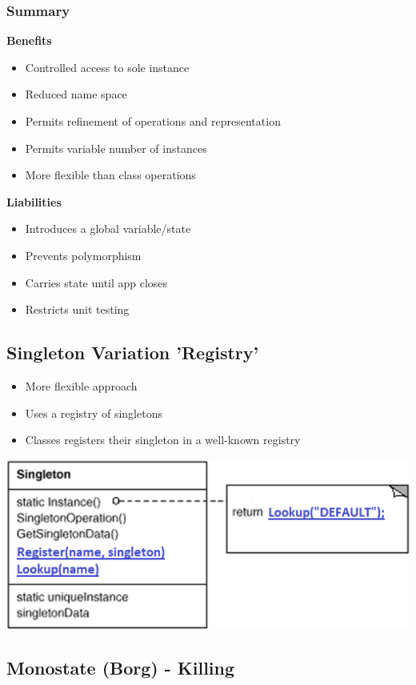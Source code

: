 \subsubsection{Summary}
\textbf{Benefits}
\begin{itemize}
    \item Controlled access to sole instance
    \item Reduced name space
    \item Permits refinement of operations and representation
    \item Permits variable number of instances
    \item More flexible than class operations
\end{itemize}
\textbf{Liabilities}
\begin{itemize}
    \item Introduces a global variable/state
    \item Prevents polymorphism
    \item Carries state until app closes
    \item Restricts unit testing
\end{itemize}

\subsection{Singleton Variation 'Registry'}
\begin{itemize}
    \item More flexible approach
    \item Uses a registry of singletons
    \item Classes registers their singleton in a well-known registry
\end{itemize}
\includegraphics[width=\linewidth]{./img/registry.png}

\subsection{Monostate (Borg) - Killing}
